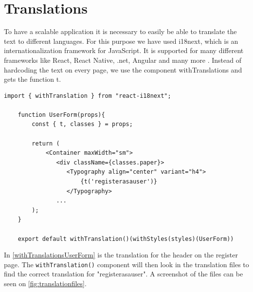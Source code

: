 \section{Translations}
To have a scalable application it is necessary to easily be able to translate the text to different languages.
For this purpose we have used i18next, which is an internationalization framework for JavaScript.
It is supported for many different frameworks like React, React Native, .net, Angular and many more \cite{react-i18next}.
Instead of hardcoding the text on every page, we use the component withTranslations and gets the function t.  

\begin{lstlisting}[caption={Translated header when registering as a user.}, captionpos=b, label={withTranslationsUserForm}]
    import { withTranslation } from "react-i18next";

    function UserForm(props){
        const { t, classes } = props;

        return (
            <Container maxWidth="sm">
               <div className={classes.paper}>
                  <Typography align="center" variant="h4">
                      {t('registerasauser')}
                  </Typography>
               ...
        );
    }

    export default withTranslation()(withStyles(styles)(UserForm))
\end{lstlisting}
\noindent
In \autoref{withTranslationsUserForm} is the translation for the header on the register page.
The \texttt{withTranslation()} component will then look in the translation files to find the correct translation for "registerasauser". 
A screenshot of the files can be seen on \autoref{fig:translationfiles}.
